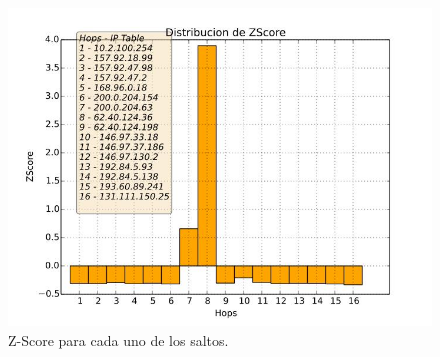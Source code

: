 \begin{figure}[H]
  \centering	
	\includegraphics[scale=0.4]{../cambridge-experiment/bar_z_score.jpeg}
  \caption{Z-Score para cada uno de los saltos.}
	\label{fig:histo-src-sitiotrabajo}
\end{figure}
